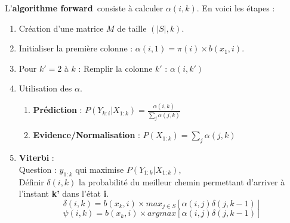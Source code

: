\documentclass{article}
\begin{document}
L'\textbf{algorithme forward} consiste à calculer $\alpha(i, k)$. En voici les étapes : 
\begin{enumerate}
\item Création d'une matrice $M$ de taille $(|S|, k)$.
\item Initialiser la première colonne : $\alpha(i, 1) = \pi(i) \times b(x_1, i) $.
\item Pour $k' = 2$ à $k$ : Remplir la colonne $k'$ : $\alpha(i, k')$
\item Utilisation des $\alpha$.
    \begin{enumerate}
    \item \textbf{Prédiction} : $P(Y_{k:i} | X_{1:k}) = \frac{\alpha(i, k)}{\sum_j \alpha(j, k)}$
    \item \textbf{Evidence/Normalisation} : $P(X_{1:k}) = \sum_j \alpha(j, k)$
    \end{enumerate}
\item \textbf{Viterbi} : \\
Question : $y_{1:k}$ qui maximise $P(Y_{1:k} | X_{1:k})$, \\
Définir $\delta(i, k)$ la probabilité du  meilleur chemin permettant d'arriver à l'instant \textbf{k'} dans l'état \textbf{i}.
$$ \delta(i, k) = b(x_k, i) \times max_{j \in S} [ \alpha(i, j) \delta(j, k-1) ] $$
$$ \psi(i, k) = b(x_k, i) \times argmax [ \alpha(i, j) \delta(j, k-1) ] $$
\end{enumerate}
\end{document}
